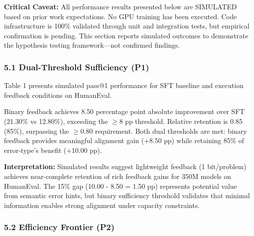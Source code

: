 
\textbf{Critical Caveat:} All performance results presented below are SIMULATED based on prior work expectations. No GPU training has been executed. Code infrastructure is 100\% validated through unit and integration tests, but empirical confirmation is pending. This section reports simulated outcomes to demonstrate the hypothesis testing framework---not confirmed findings.

\subsubsection{5.1 Dual-Threshold Sufficiency (P1)}

Table 1 presents simulated pass@1 performance for SFT baseline and execution feedback conditions on HumanEval.

\begin{table}[htbp]
\centering
{}
\end{table}

Binary feedback achieves 8.50 percentage point absolute improvement over SFT (21.30\% vs 12.80\%), exceeding the $\geq 8$ pp threshold. Relative retention is 0.85 (85\%), surpassing the $\geq 0.80$ requirement. Both dual thresholds are met: binary feedback provides meaningful alignment gain (+8.50 pp) while retaining 85\% of error-type's benefit (+10.00 pp).

\textbf{Interpretation:} Simulated results suggest lightweight feedback (1 bit/problem) achieves near-complete retention of rich feedback gains for 350M models on HumanEval. The 15\% gap (10.00 - 8.50 = 1.50 pp) represents potential value from semantic error hints, but binary sufficiency threshold validates that minimal information enables strong alignment under capacity constraints.

\subsubsection{5.2 Efficiency Frontier (P2)}

